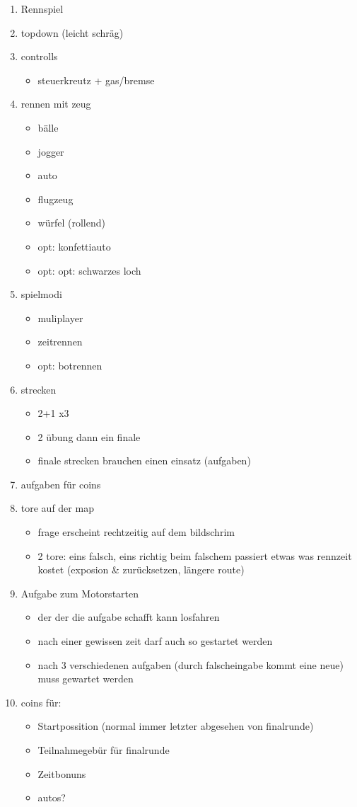 \begin{enumerate}
	\item{Rennspiel}
	\item{topdown (leicht schräg)}
	\item{controlls}
	\begin{itemize}
		\item{steuerkreutz + gas/bremse}
	\end{itemize}
	\item{rennen mit zeug}
	\begin{itemize}
		\item bälle
		\item jogger
		\item auto
		\item flugzeug
		\item würfel (rollend)
		\item opt: konfettiauto
		\item opt: opt: schwarzes loch
	\end{itemize}
	\item spielmodi
	\begin{itemize}
		\item muliplayer
		\item zeitrennen
		\item opt: botrennen
	\end{itemize}
	\item strecken
	\begin{itemize}
		\item{2+1 x3}
		\item{2 übung dann ein finale}
		\item{finale strecken brauchen einen einsatz (aufgaben)}
	\end{itemize}
	\item{aufgaben für coins}
	\item{tore auf der map}
	\begin{itemize}
		\item{frage erscheint rechtzeitig auf dem bildschrim}
		\item{2 tore: eins falsch, eins richtig}
			beim falschem passiert etwas was rennzeit kostet (exposion \& zurücksetzen, längere route)
	\end{itemize}
	\item{Aufgabe zum Motorstarten}
		\begin{itemize}
			\item{der der die aufgabe schafft kann losfahren}
			\item{nach einer gewissen zeit darf auch so gestartet werden}
			\item{nach 3 verschiedenen aufgaben (durch falscheingabe kommt eine neue) muss gewartet werden}
		\end{itemize}
	\item coins für:
	\begin{itemize}
		\item{Startpossition (normal immer letzter abgesehen von finalrunde)}
		\item{Teilnahmegebür für finalrunde}
		\item{Zeitbonuns}
		\item{autos?}
	\end{itemize}
\end{enumerate}

